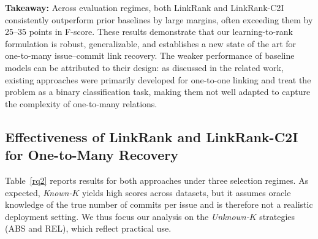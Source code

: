 \textbf{Takeaway:} Across evaluation regimes, both LinkRank and LinkRank-C2I consistently outperform prior baselines by large margins, often exceeding them by 25--35 points in F-score. These results demonstrate that our learning-to-rank formulation is robust, generalizable, and establishes a new state of the art for one-to-many issue--commit link recovery. The weaker performance of baseline models can be attributed to their design: as discussed in the related work, existing approaches were primarily developed for one-to-one linking and treat the problem as a binary classification task, making them not well adapted to capture the complexity of one-to-many relations.








\subsection{Effectiveness of LinkRank and LinkRank-C2I for One-to-Many Recovery}

Table~\ref{rq2} reports results for both approaches under three selection regimes. As expected, \textit{Known-$K$} yields high scores across datasets, but it assumes oracle knowledge of the true number of commits per issue and is therefore not a realistic deployment setting. We thus focus our analysis on the \textit{Unknown-$K$} strategies (ABS and REL), which reflect practical use.\\

